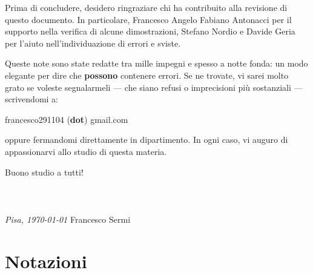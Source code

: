 \documentclass[12pt, twoside, italian]{book}
\begin{document}
	Prima di concludere, desidero ringraziare chi ha contribuito alla revisione di questo documento. In particolare, Francesco Angelo Fabiano Antonacci per il supporto nella verifica di alcune dimostrazioni, Stefano Nordio e Davide Geria per l'aiuto nell'individuazione di errori e sviste.\

	Queste note sono state redatte tra mille impegni e spesso a notte fonda: un modo elegante per dire che \textbf{possono} contenere errori. Se ne trovate, vi sarei molto grato se voleste segnalarmeli — che siano refusi o imprecisioni più sostanziali — scrivendomi a:
	\begin{center}
	francesco291104 (\textbf{dot}) gmail.com
	\end{center}

	oppure fermandomi direttamente in dipartimento. In ogni caso, vi auguro di appassionarvi allo studio di questa materia.\

	Buono studio a tutti! \\ \\ \\ \\
	\emph{Pisa, \today} \hfill Francesco Sermi\
	\vfill
	\cleardoublepage
	\chapter*{Notazioni}
	\pagestyle{empty}
	\thispagestyle{empty}
	\pagestyle{fancy}
\end{document}
